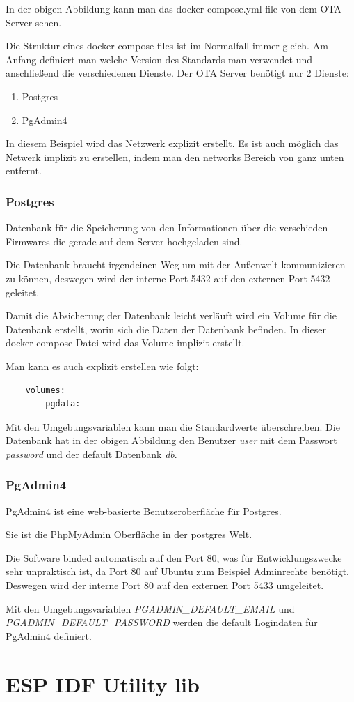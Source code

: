 In der obigen Abbildung kann man das docker-compose.yml file von dem OTA Server sehen.

Die Struktur eines docker-compose files ist im Normalfall immer gleich. Am Anfang definiert man welche Version des Standards man verwendet und anschließend die verschiedenen Dienste. Der OTA Server benötigt nur 2 Dienste:

\begin{enumerate}
    \item Postgres
    \item PgAdmin4
\end{enumerate}

In diesem Beispiel wird das Netzwerk explizit erstellt. Es ist auch möglich das Netwerk implizit zu erstellen, indem man den networks Bereich von ganz unten entfernt.

\subsubsection{Postgres}

Datenbank für die Speicherung von den Informationen über die verschieden Firmwares die gerade auf dem Server hochgeladen sind.

Die Datenbank braucht irgendeinen Weg um mit der Außenwelt kommunizieren zu können, deswegen wird der interne Port 5432 auf den externen Port 5432 geleitet.

Damit die Absicherung der Datenbank leicht verläuft wird ein Volume für die Datenbank erstellt, worin sich die Daten der Datenbank befinden. In dieser docker-compose Datei wird das Volume implizit erstellt. 

Man kann es auch explizit erstellen wie folgt:

\begin{verbatim}
    volumes:
        pgdata:
\end{verbatim}

Mit den Umgebungsvariablen kann man die Standardwerte überschreiben. Die Datenbank hat in der obigen Abbildung den Benutzer \textit{user} mit dem Passwort \textit{password} und der default Datenbank \textit{db}.

\subsubsection{PgAdmin4}

PgAdmin4 ist eine web-basierte Benutzeroberfläche für Postgres.

Sie ist die PhpMyAdmin Oberfläche in der postgres Welt.

Die Software binded automatisch auf den Port 80, was für Entwicklungszwecke sehr unpraktisch ist, da Port 80 auf Ubuntu zum Beispiel Adminrechte benötigt. Deswegen wird der interne Port 80 auf den externen Port 5433 umgeleitet.

Mit den Umgebungsvariablen \textit{PGADMIN\_DEFAULT\_EMAIL} und 
\textit{PGADMIN\_DEFAULT\_PASSWORD} werden die default Logindaten für PgAdmin4 definiert. 

\section{ESP IDF Utility lib}\label{sec:esp-idf-utility-lib}
